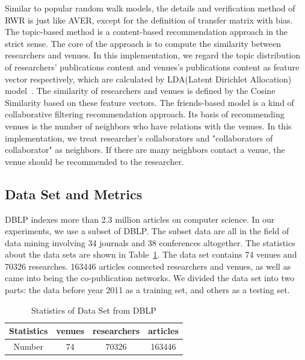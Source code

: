 \documentclass[9pt]{acm_proc_article-sp}
\begin{document}
Similar to popular random walk models, the details and verification method of RWR is just like AVER, except for the definition of transfer matrix with bias. The topic-based method is a content-based recommendation approach in the strict sense. The core of the approach is to compute the similarity between researchers and venues. In this implementation, we regard the topic distribution of researchers' publications content and venues's publications content as feature vector respectively, which are calculated by LDA(Latent Dirichlet Allocation) model~\cite{blei2003latent}. The similarity of researchers and venues is defined by the Cosine Similarity based on these feature vectors. The friends-based model is a kind of collaborative filtering recommendation approach. Its basis of recommending venues is the number of neighbors who have relations with the venues. In this implementation, we treat researcher's collaborators and "collaborators of collaborator" as neighbors. If there are many neighbors contact a venue, the venue should be recommended to the researcher.

\subsection{Data Set and Metrics}
DBLP indexes more than 2.3 million articles on computer science. In our experiments, we use a subset of DBLP. The subset data are all in the field of data mining involving 34 journals and 38 conferences altogether. The statistics about the data sets are shown in Table~\ref{table1}. The data set contains 74 venues and 70326 researches. 163446 articles connected researchers and venues, as well as came into being the co-publication networks. We divided the data set into two parts: the data before year 2011 as a training set, and others as a testing set.
\begin{table}
\renewcommand{\arraystretch}{1.2}
\centering
\caption{Statistics of Data Set from DBLP}
\label{table1}
\begin{tabular}{|c|c|c|c|} \hline
Statistics &venues&researchers&articles\\ \hline
Number & 74 & 70326 &163446 \\
\hline\end{tabular}
\end{table}
\end{document}
